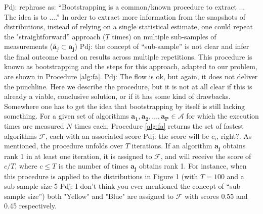 \documentclass[conference]{IEEEtran}
\newcommand{\p}[1]{{\color{blue} Pdj: #1}}
\begin{document}
\p{rephrase as: ``Bootstrapping is a common/known procedure to extract ... The idea is to ....''} 
In order to extract more information from the snapshots of distributions, instead of relying on a single statistical
estimate, one could repeat the "straightforward'' approach ($T$ times) on multiple sub-samples of measurements
($\tilde{\mathbf{a}_j} \subset \mathbf{a_j}$) \p{the concept of ``sub-sample'' is not clear} and infer the final outcome
based on results across multiple repetitions. This procedure is known as bootstrapping\cite{bootstrap} and the steps for
this approach, adapted to our problem, are shown in Procedure \ref{alg:fa}.
\p{The flow is ok, but again, it does not deliver the punchline. Here we describe the procedure, but it is not at all
  clear if this is already a viable, conclusive solution, or if it has some kind of drawbacks. Somewhere one has to get
  the idea that bootstrapping by itself is still lacking something.}
For a given set of algorithms $
\mathbf{a_1},\mathbf{a_2} ,..., \mathbf{a_P}\in \mathcal{A}$ for which the execution times are measured $N$ times each,
Procedure \ref{alg:fa} returns the set of fastest algorithms $\mathcal{F}$, each with an associated score \p{the
  score will be $c_i$, right?}. As mentioned, the procedure unfolds over $T$ iterations.
If an algorithm $\mathbf{a_j}$ obtains rank 1 in at least one iteration, it is assigned to $\mathcal{F}$, and will
receive the score of  $c/T$, where $c \le T$ is the number of times $\mathbf{a_j}$ obtains rank 1.
For instance, when this procedure is applied to the distributions in Figure 1 (with $T=100$ and a sub-sample size 5 \p{I
  don't think you ever mentioned the concept of ``sub-sample size''}) both "Yellow" and "Blue" are assigned to $\mathcal{F}$ with scores 0.55 and 0.45 respectively.
 
\end{document}
